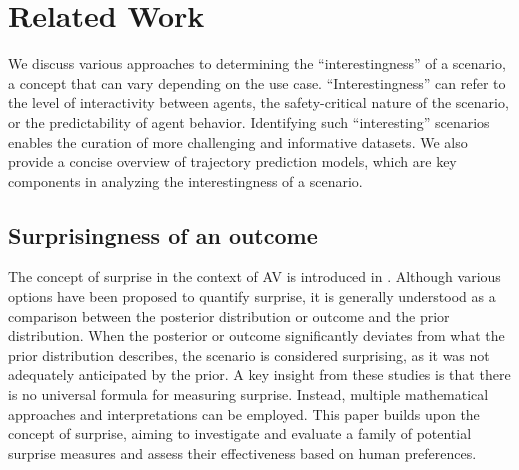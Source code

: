 \section{Related Work}
We discuss various approaches to determining the ``interestingness'' of a scenario, a concept that can vary depending on the use case. ``Interestingness'' can refer to the level of interactivity between agents, the safety-critical nature of the scenario, or the predictability of agent behavior. Identifying such ``interesting'' scenarios enables the curation of more challenging and informative datasets. We also provide a concise overview of trajectory prediction models, which are key components in analyzing the interestingness of a scenario.

\subsection{Surprisingness of an outcome}
The concept of surprise in the context of AV is introduced in \cite{dinparastdjadid2023measuring,engstrom2024modeling}. Although various options have been proposed to quantify surprise, it is generally understood as a comparison between the posterior distribution or outcome and the prior distribution. 
When the posterior or outcome significantly deviates from what the prior distribution describes, the scenario is considered surprising, as it was not adequately anticipated by the prior. A key insight from these studies is that there is no universal formula for measuring surprise. Instead, multiple mathematical approaches and interpretations can be employed. This paper builds upon the concept of surprise, aiming to investigate and evaluate a family of potential surprise measures and assess their effectiveness based on human preferences.

